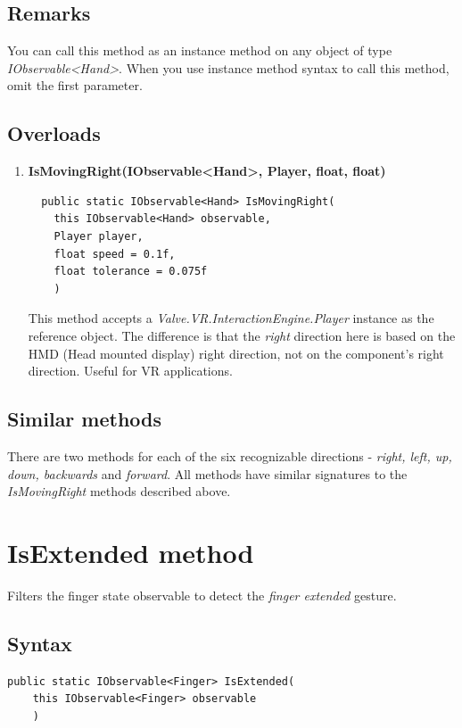 \documentclass[12pt,a4paper,twoside]{report}
\begin{document}
\subsection{Remarks}
You can call this method as an instance method on any object of type \textit{IObservable<Hand>}. When you use instance method syntax to call this method, omit the first parameter.

\subsection{Overloads}
\begin{enumerate}
  \item \textbf{IsMovingRight(IObservable<Hand>, Player, float, float)}
\begin{lstlisting}
  public static IObservable<Hand> IsMovingRight(
    this IObservable<Hand> observable,
    Player player,
    float speed = 0.1f,
    float tolerance = 0.075f
    )
\end{lstlisting}
  This method accepts a \textit{Valve.VR.InteractionEngine.Player} instance as the reference object. The difference is that the \textit{right} direction here is based on the HMD (Head mounted display) right direction, not on the component's right direction. Useful for VR applications.
\end{enumerate}

\subsection{Similar methods}
There are two methods for each of the six recognizable directions - \textit{right, left, up, down, backwards} and \textit{forward}. All methods have similar signatures to the \textit{IsMovingRight} methods described above.

\newpage

\section{IsExtended method}
Filters the finger state observable to detect the \textit{finger extended} gesture.

\subsection{Syntax}
\begin{lstlisting}[caption=Declaration]
  public static IObservable<Finger> IsExtended(
    this IObservable<Finger> observable
    )
\end{lstlisting}
\end{document}
